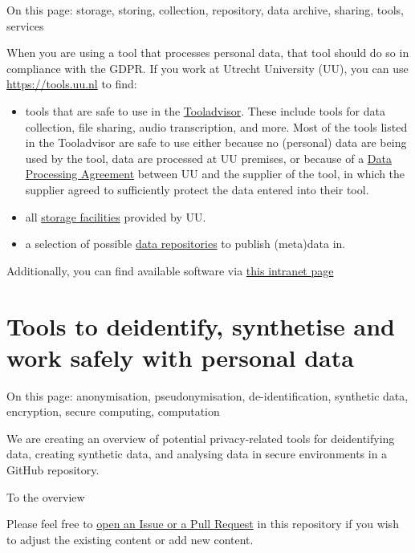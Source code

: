 \documentclass[
]{book}
\providecommand{\tightlist}{%
  \setlength{\itemsep}{0pt}\setlength{\parskip}{0pt}}
\begin{document}
On this page: storage, storing, collection, repository, data archive, sharing,
tools, services

When you are using a tool that processes personal data, that tool should do so
in compliance with the GDPR. If you work at Utrecht University (UU), you can use
\url{https://tools.uu.nl} to find:

\begin{itemize}
\tightlist
\item
  tools that are safe to use in the \href{https://tools.uu.nl/tooladvisor}{Tooladvisor}.
  These include tools for data collection, file sharing, audio transcription, and more.
  Most of the tools listed in the Tooladvisor are safe to use either because no (personal)
  data are being used by the tool, data are processed at UU premises, or because
  of a \protect\hyperlink{data-processing-agreement}{Data Processing Agreement} between
  UU and the supplier of the tool, in which the supplier agreed to
  sufficiently protect the data entered into their tool.
\item
  all \href{https://tools.uu.nl/storagefinder/}{storage facilities}
  provided by UU.
\item
  a selection of possible \href{https://tools.uu.nl/repository-decision-tool/}{data repositories}
  to publish (meta)data in.
\end{itemize}

Additionally, you can find available software via
\href{https://intranet.uu.nl/en/knowledgebase/software-at-work-teaching-rooms-and-home}{this intranet page}

\hypertarget{tool-repository}{%
\section{Tools to deidentify, synthetise and work safely with personal data}\label{tool-repository}}

On this page: anonymisation, pseudonymisation, de-identification, synthetic data, encryption,
secure computing, computation

We are creating an overview of potential privacy-related tools for
deidentifying data, creating synthetic data, and analysing data in secure
environments in a GitHub repository.

To the overview

Please feel free to
\href{https://github.com/UtrechtUniversity/privacy-engineering-tools/\#contact-and-contribution}{open an Issue or a Pull Request}
in this repository if you wish to adjust the existing content or add new content.
\end{document}
